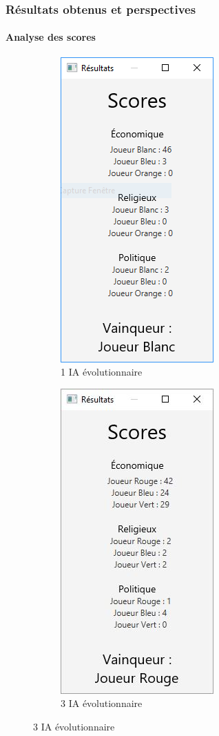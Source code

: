 \begin{frame}
	\frametitle{Résultats obtenus et perspectives}
	\framesubtitle{Analyse des scores}
	\begin{figure}
		\begin{subfigure}{0.4\textwidth}
			\centering
			\includegraphics[width=0.5\linewidth]{images/score_evol_vs_random}
			\caption{1 IA évolutionnaire}
		\end{subfigure}
		\begin{subfigure}{0.5\textwidth}
			\centering
			\includegraphics[width=0.4\linewidth]{images/resultats}
			\caption{3 IA évolutionnaire}
		\end{subfigure}
	\end{figure}
\end{frame}
